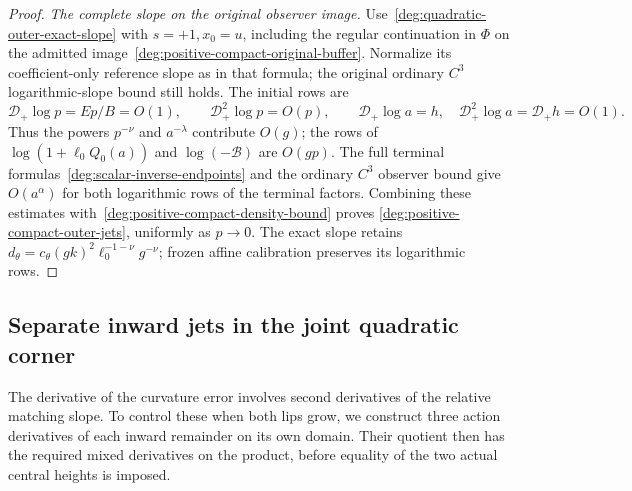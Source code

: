 \begin{proof}
\smallskip
\noindent\emph{The complete slope on the original observer image.}
Use~\eqref{deg:quadratic-outer-exact-slope} with \(s=+1,x_0=u\),
including the regular continuation in \(\Phi\) on the admitted
image~\eqref{deg:positive-compact-original-buffer}. Normalize its
coefficient-only reference slope as in that formula; the original
ordinary \(C^3\) logarithmic-slope bound still holds. The initial rows are
\[
 \mathcal D_+\log p=Ep/B=O(1),\qquad
 \mathcal D_+^2\log p=O(p),\qquad
 \mathcal D_+\log a=h,\quad \mathcal D_+^2\log a=\mathcal D_+h=O(1).
\]
Thus the powers \(p^{-\nu}\) and \(a^{-\lambda}\) contribute
\(O(g)\); the rows of \(\log(1+\ell_0Q_0(a))\) and
\(\log(-\mathscr B)\) are \(O(gp)\).
The full terminal formulas~\eqref{deg:scalar-inverse-endpoints} and
the ordinary \(C^3\) observer bound give \(O(a^\alpha)\) for both
logarithmic rows of the terminal factors. Combining these estimates
with~\eqref{deg:positive-compact-density-bound} proves
\eqref{deg:positive-compact-outer-jets}, uniformly as \(p\to0\).
The exact slope retains \(d_\theta=c_\theta(gk)^2\ell_0^{-1-\nu}g^{-\nu}\);
frozen affine calibration preserves its logarithmic rows.
\end{proof}

\subsection{Separate inward jets in the joint quadratic corner}

The derivative of the curvature error involves second derivatives of
the relative matching slope. To control these when both lips grow,
we construct three action derivatives of each inward remainder on its
own domain. Their quotient then has the required mixed derivatives on
the product, before equality of the two actual central heights is imposed.

